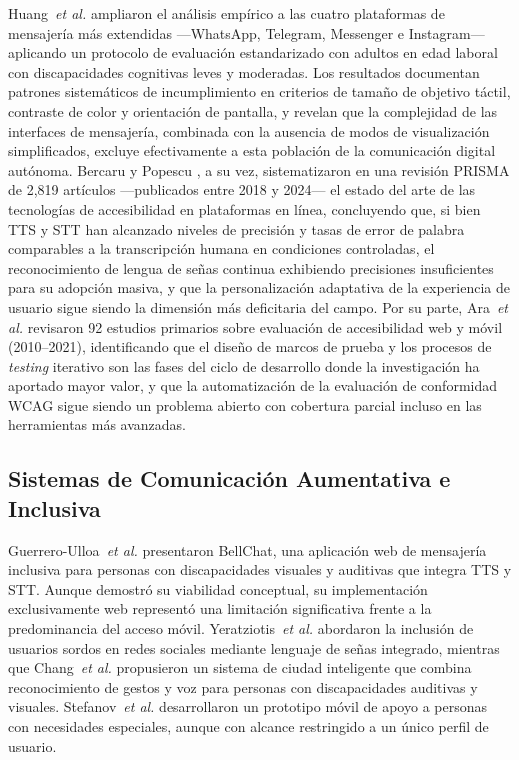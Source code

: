 \documentclass[journal]{IEEEtran}
\begin{document}
Huang~\textit{et al.} \cite{huang2025} ampliaron el an\'alisis emp\'irico a las cuatro plataformas de mensajer\'ia m\'as extendidas ---WhatsApp, Telegram, Messenger e Instagram--- aplicando un protocolo de evaluaci\'on estandarizado con adultos en edad laboral con discapacidades cognitivas leves y moderadas. Los resultados documentan patrones sistem\'aticos de incumplimiento en criterios de tama\~no de objetivo t\'actil, contraste de color y orientaci\'on de pantalla, y revelan que la complejidad de las interfaces de mensajer\'ia, combinada con la ausencia de modos de visualizaci\'on simplificados, excluye efectivamente a esta poblaci\'on de la comunicaci\'on digital aut\'onoma. Bercaru y Popescu \cite{bercaru2024}, a su vez, sistematizaron en una revisi\'on PRISMA de 2{,}819 art\'iculos ---publicados entre 2018 y 2024--- el estado del arte de las tecnolog\'ias de accesibilidad en plataformas en l\'inea, concluyendo que, si bien TTS y STT han alcanzado niveles de precisi\'on y tasas de error de palabra comparables a la transcripci\'on humana en condiciones controladas, el reconocimiento de lengua de se\~nas continua exhibiendo precisiones insuficientes para su adopci\'on masiva, y que la personalizaci\'on adaptativa de la experiencia de usuario sigue siendo la dimensi\'on m\'as deficitaria del campo. Por su parte, Ara~\textit{et al.} \cite{ara2024} revisaron 92 estudios primarios sobre evaluaci\'on de accesibilidad web y m\'ovil (2010--2021), identificando que el dise\~no de marcos de prueba y los procesos de \textit{testing} iterativo son las fases del ciclo de desarrollo donde la investigaci\'on ha aportado mayor valor, y que la automatizaci\'on de la evaluaci\'on de conformidad WCAG sigue siendo un problema abierto con cobertura parcial incluso en las herramientas m\'as avanzadas.

\subsection{Sistemas de Comunicaci\'on Aumentativa e Inclusiva}

Guerrero-Ulloa~\textit{et al.} \cite{guerrero2021bellchat} presentaron BellChat, una aplicaci\'on web de mensajer\'ia inclusiva para personas con discapacidades visuales y auditivas que integra TTS y STT. Aunque demostr\'o su viabilidad conceptual, su implementaci\'on exclusivamente web represent\'o una limitaci\'on significativa frente a la predominancia del acceso m\'ovil. Yeratziotis~\textit{et al.} \cite{yeratziotis2023} abordaron la inclusi\'on de usuarios sordos en redes sociales mediante lenguaje de se\~nas integrado, mientras que Chang~\textit{et al.} \cite{chang2022} propusieron un sistema de ciudad inteligente que combina reconocimiento de gestos y voz para personas con discapacidades auditivas y visuales. Stefanov~\textit{et al.} \cite{stefanov2024} desarrollaron un prototipo m\'ovil de apoyo a personas con necesidades especiales, aunque con alcance restringido a un \'unico perfil de usuario.
\end{document}
